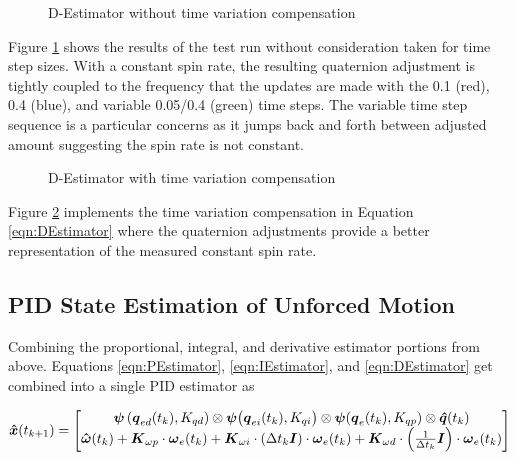 \begin{figure}[H]
  \centerline{}
  \caption{D-Estimator without time variation compensation}
  \label{fig:DEstimatorwithouttimevariationcompensation}
\end{figure}

Figure \ref{fig:DEstimatorwithouttimevariationcompensation} shows the results of the test run without consideration taken for time step sizes.  With a constant spin rate, the resulting quaternion adjustment is tightly coupled to the frequency that the updates are made with the 0.1 (red), 0.4 (blue), and variable 0.05/0.4 (green) time steps.  The variable time step sequence is a particular concerns as it jumps back and forth between adjusted amount suggesting the spin rate is not constant.

\begin{figure}[H]
  \centerline{}
  \caption{D-Estimator with time variation compensation}
  \label{fig:DEstimatorwithtimevariationcompensation}
\end{figure}

Figure \ref{fig:DEstimatorwithtimevariationcompensation} implements the time variation compensation in Equation \ref{eqn:DEstimator} where the quaternion adjustments provide a better representation of the measured constant spin rate.

\subsection{PID State Estimation of Unforced Motion}
\label{subsec:PIDEstimatorofUnforcedMotion}

Combining the proportional, integral, and derivative estimator portions from above.  Equations \ref{eqn:PEstimator}, \ref{eqn:IEstimator}, and \ref{eqn:DEstimator} get combined into a single PID estimator as

\begin{equation}
  \boldsymbol{\hat{x}}(t_{k+1}) = \begin{bmatrix} \boldsymbol{\psi}\left(\boldsymbol{q}_{ed}(t_k), K_{qd}\right) \otimes \boldsymbol{\psi}\big(\boldsymbol{q}_{ei}(t_k), K_{qi}\big) \otimes \boldsymbol{\psi}(\boldsymbol{q}_e(t_{k}), K_{qp})  \otimes \boldsymbol{\hat{q}}(t_{k}) \\
  \boldsymbol{\hat{\omega}}(t_{k}) + \boldsymbol{K}_{\omega p} \cdot \boldsymbol{\omega}_e(t_{k}) + \boldsymbol{K}_{\omega i} \cdot (\Delta t_k \boldsymbol{I})\cdot \boldsymbol{\omega}_e(t_{k}) + \boldsymbol{K}_{\omega d} \cdot \left(\frac{1}{\Delta t_k} \boldsymbol{I}\right) \cdot \boldsymbol{\omega}_e(t_{k}) \end{bmatrix}
  \label{eqn:PIDEstimatorUnforcedMotion}
\end{equation}

